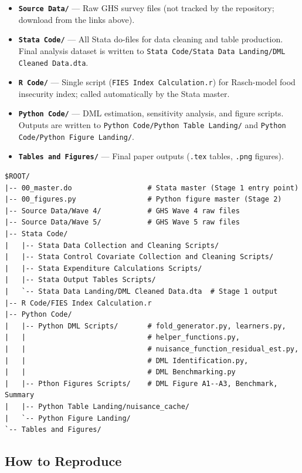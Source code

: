 \documentclass[11pt]{article}
\begin{document}
\begin{itemize}
    \item \textbf{\texttt{Source Data/}} --- Raw GHS survey files
          (not tracked by the repository; download from the links above).
    \item \textbf{\texttt{Stata Code/}} --- All Stata do-files for data
          cleaning and table production. Final analysis dataset is written
          to \texttt{Stata Code/Stata Data Landing/DML Cleaned Data.dta}.
    \item \textbf{\texttt{R Code/}} --- Single script
          (\texttt{FIES Index Calculation.r}) for Rasch-model food
          insecurity index; called automatically by the Stata master.
    \item \textbf{\texttt{Python Code/}} --- DML estimation, sensitivity
          analysis, and figure scripts. Outputs are written to
          \texttt{Python Code/Python Table Landing/} and
          \texttt{Python Code/Python Figure Landing/}.
    \item \textbf{\texttt{Tables and Figures/}} --- Final paper outputs
          (\texttt{.tex} tables, \texttt{.png} figures).
\end{itemize}

\begin{lstlisting}
$ROOT/
|-- 00_master.do                  # Stata master (Stage 1 entry point)
|-- 00_figures.py                 # Python figure master (Stage 2)
|-- Source Data/Wave 4/           # GHS Wave 4 raw files
|-- Source Data/Wave 5/           # GHS Wave 5 raw files
|-- Stata Code/
|   |-- Stata Data Collection and Cleaning Scripts/
|   |-- Stata Control Covariate Collection and Cleaning Scripts/
|   |-- Stata Expenditure Calculations Scripts/
|   |-- Stata Output Tables Scripts/
|   `-- Stata Data Landing/DML Cleaned Data.dta  # Stage 1 output
|-- R Code/FIES Index Calculation.r
|-- Python Code/
|   |-- Python DML Scripts/       # fold_generator.py, learners.py,
|   |                             # helper_functions.py,
|   |                             # nuisance_function_residual_est.py,
|   |                             # DML Identification.py,
|   |                             # DML Benchmarking.py
|   |-- Pthon Figures Scripts/    # DML Figure A1--A3, Benchmark, Summary
|   |-- Python Table Landing/nuisance_cache/
|   `-- Python Figure Landing/
`-- Tables and Figures/
\end{lstlisting}

\subsection{How to Reproduce}
\end{document}
